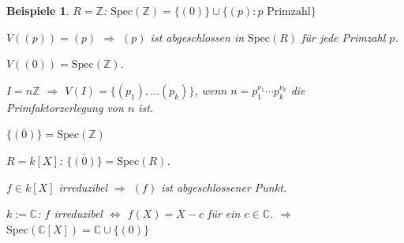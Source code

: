 \documentclass[a4paper,12pt]{scrbook}
\theoremstyle{break}
\theoremstyle{nonumberbreak}
\newtheorem{nnBsp}{Beispiele}
\theoremstyle{nonumberplain}
\begin{document}
\begin{nnBsp}

$R = \mathbb{Z}$: $\textrm{Spec}(\mathbb{Z}) = \{ (0) \} \cup \{ (p) : p \text{ Primzahl} \}$

$V( (p) ) = (p)$ $\Rightarrow$ $(p)$ ist abgeschlossen in $\textrm{Spec}(R)$ für jede Primzahl $p$.

$V( (0) ) = \textrm{Spec}(\mathbb{Z})$.

$I = n \mathbb{Z}$ $\Rightarrow$ $V(I) = \{ (p_1), \ldots (p_k) \}$, wenn $n = p_1^{\nu_1} \cdots p_k^{\nu_k}$ die Primfaktorzerlegung von $n$ ist.

$\overline{ \{ (0) \} } = \textrm{Spec}(\mathbb{Z})$
\bigskip

$R = k[X]$: $\overline{ \{ (0) \} } = \textrm{Spec}(R)$.

$f \in k[X]$ irreduzibel $\Rightarrow$ $(f)$ ist abgeschlossener Punkt.

$k := \mathbb{C}$: $f$ irreduzibel $\Leftrightarrow$ $f(X) = X - c$ für ein $c \in \mathbb{C}$. $\Rightarrow$ $\textrm{Spec}(\mathbb{C}[X]) = \mathbb{C} \cup \{ (0) \}$

\end{nnBsp}
\end{document}
